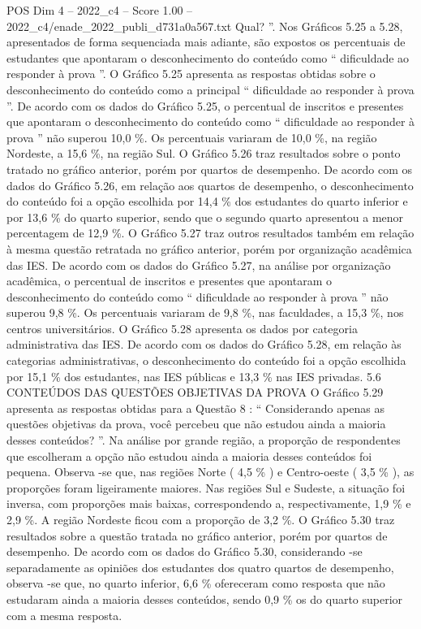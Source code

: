 \begin{textsample}{POS Dim 4 – 2022\_c4 – Score 1.00 – 2022\_c4/enade\_2022\_publi\_d731a0a567.txt}
Qual? ”.
Nos Gráficos 5.25 a 5.28, apresentados de forma sequenciada mais adiante, são expostos os percentuais de estudantes que apontaram o desconhecimento do conteúdo como “ dificuldade ao responder à prova ”.
O Gráfico 5.25 apresenta as respostas obtidas sobre o desconhecimento do conteúdo como a principal “ dificuldade ao responder à prova ”.
De acordo com os dados do Gráfico 5.25, o percentual de inscritos e presentes que apontaram o desconhecimento do conteúdo como “ dificuldade ao responder à prova ” não superou 10,0 \%.
Os percentuais variaram de 10,0 \%, na região Nordeste, a 15,6 \%, na região Sul.
O Gráfico 5.26 traz resultados sobre o ponto tratado no gráfico anterior, porém por quartos de desempenho.
De acordo com os dados do Gráfico 5.26, em relação aos quartos de desempenho, o desconhecimento do conteúdo foi a opção escolhida por 14,4 \% dos estudantes do quarto inferior e por 13,6 \% do quarto superior, sendo que o segundo quarto apresentou a menor percentagem de 12,9 \%.
O Gráfico 5.27 traz outros resultados também em relação à mesma questão retratada no gráfico anterior, porém por organização acadêmica das IES.
De acordo com os dados do Gráfico 5.27, na análise por organização acadêmica, o percentual de inscritos e presentes que apontaram o desconhecimento do conteúdo como “ dificuldade ao responder à prova ” não superou 9,8 \%.
Os percentuais variaram de 9,8 \%, nas faculdades, a 15,3 \%, nos centros universitários.
O Gráfico 5.28 apresenta os dados por categoria administrativa das IES.
De acordo com os dados do Gráfico 5.28, em relação às categorias administrativas, o desconhecimento do conteúdo foi a opção escolhida por 15,1 \% dos estudantes, nas IES públicas e 13,3 \% nas IES privadas. 5.6 CONTEÚDOS DAS QUESTÕES OBJETIVAS DA PROVA O Gráfico 5.29 apresenta as respostas obtidas para a Questão 8 : “ Considerando apenas as questões objetivas da prova, você percebeu que não estudou ainda a maioria desses conteúdos? ”.
Na análise por grande região, a proporção de respondentes que escolheram a opção não estudou ainda a maioria desses conteúdos foi pequena.
Observa -se que, nas regiões Norte ( 4,5 \% ) e Centro-oeste ( 3,5 \% ), as proporções foram ligeiramente maiores.
Nas regiões Sul e Sudeste, a situação foi inversa, com proporções mais baixas, correspondendo a, respectivamente, 1,9 \% e 2,9 \%.
A região Nordeste ficou com a proporção de 3,2 \%.
O Gráfico 5.30 traz resultados sobre a questão tratada no gráfico anterior, porém por quartos de desempenho.
De acordo com os dados do Gráfico 5.30, considerando -se separadamente as opiniões dos estudantes dos quatro quartos de desempenho, observa -se que, no quarto inferior, 6,6 \% ofereceram como resposta que não estudaram ainda a maioria desses conteúdos, sendo 0,9 \% os do quarto superior com a mesma resposta.

\end{textsample}
